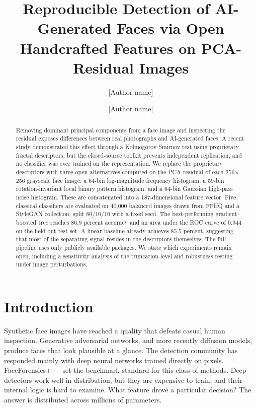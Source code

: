 \documentclass[runningheads]{llncs}
\begin{document}
\title{Reproducible Detection of AI-Generated Faces via Open Handcrafted Features on PCA-Residual Images}

\author{[Author name] \and [Author name]}
\authorrunning{[Author et al.]}

\maketitle

\begin{abstract}
Removing dominant principal components from a face image and inspecting the residual exposes differences between real photographs and AI-generated faces. A recent study demonstrated this effect through a Kolmogorov-Smirnov test using proprietary fractal descriptors, but the closed-source toolkit prevents independent replication, and no classifier was ever trained on the representation. We replace the proprietary descriptors with three open alternatives computed on the PCA residual of each 256$\times$256 grayscale face image: a 64-bin log-magnitude frequency histogram, a 59-bin rotation-invariant local binary pattern histogram, and a 64-bin Gaussian high-pass noise histogram. These are concatenated into a 187-dimensional feature vector. Five classical classifiers are evaluated on 40,000 balanced images drawn from FFHQ and a StyleGAN collection, split 80/10/10 with a fixed seed. The best-performing gradient-boosted tree reaches 86.9 percent accuracy and an area under the ROC curve of 0.944 on the held-out test set. A linear baseline already achieves 85.5 percent, suggesting that most of the separating signal resides in the descriptors themselves. The full pipeline uses only publicly available packages. We state which experiments remain open, including a sensitivity analysis of the truncation level and robustness testing under image perturbations.

\end{abstract}

\section{Introduction}

Synthetic face images have reached a quality that defeats casual human inspection. Generative adversarial networks, and more recently diffusion models, produce faces that look plausible at a glance. The detection community has responded mainly with deep neural networks trained directly on pixels. FaceForensics++~\cite{rossler2019} set the benchmark standard for this class of methods. Deep detectors work well in distribution, but they are expensive to train, and their internal logic is hard to examine. What feature drove a particular decision? The answer is distributed across millions of parameters.
\end{document}
